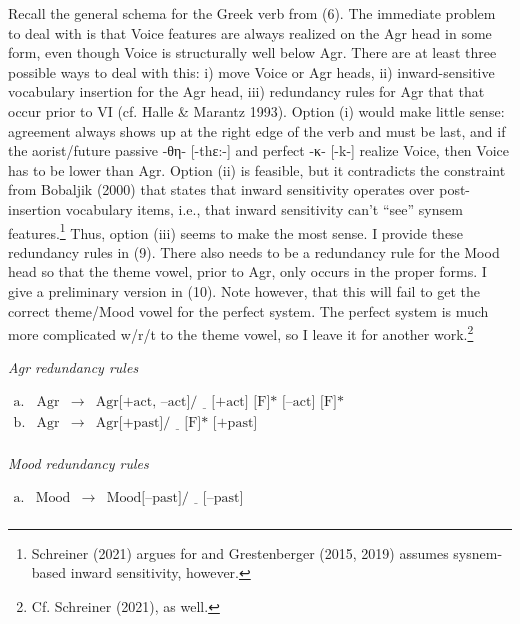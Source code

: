 \documentclass[]{ling-200b-2}
\begin{document}
Recall the general schema for the Greek verb from (6). The immediate problem to deal with is that Voice features are always realized on the Agr head in some form, even though Voice is structurally well below Agr. There are at least three possible ways to deal with this: i) move Voice or Agr heads, ii) inward-sensitive vocabulary insertion for the Agr head, iii) redundancy rules for Agr that that occur prior to VI (cf. Halle \& Marantz 1993). Option (i) would make little sense: agreement always shows up at the right edge of the verb and must be last, and if the aorist/future passive -θη- [-t\super hε:-] and perfect -κ- [-k-] realize Voice, then Voice has to be lower than Agr. Option (ii) is feasible, but it contradicts the constraint from Bobaljik (2000) that states that inward sensitivity operates over post-insertion vocabulary items, i.e., that inward sensitivity can't ``see'' synsem features.\footnote{Schreiner (2021) argues for and Grestenberger (2015, 2019) assumes sysnem-based inward sensitivity, however.} Thus, option (iii) seems to make the most sense. I provide these redundancy rules in (9). There also needs to be a redundancy rule for the Mood head so that the theme vowel, prior to Agr, only occurs in the proper forms. I give a preliminary version in (10). Note however, that this will fail to get the correct theme/Mood vowel for the perfect system. The perfect system is much more complicated w/r/t to the theme vowel, so I leave it for another work.\footnote{Cf. Schreiner (2021), as well.}

\noindent \hfill \par
\ex \textit{Agr redundancy rules}

\begin{math}
\begin{array}{llll}
    \textrm{a.} & \textrm{Agr} & \rightarrow & \textrm{Agr[+act, --act]} / \underline{\hspace{1em}} \textrm{[+act] [F]* [--act] [F]*} \\
    \textrm{b.} & \textrm{Agr} & \rightarrow & \textrm{Agr[+past]} / \underline{\hspace{1em}} \textrm{[F]* [+past]} \\
\end{array}
\end{math}
\xe


\noindent \hfill \par
\ex \textit{Mood redundancy rules}

\begin{math}
\begin{array}{llll}
    \textrm{a.} & \textrm{Mood} & \rightarrow & \textrm{Mood[--past]} / \underline{\hspace{1em}} \textrm{[--past]} \\
\end{array}
\end{math}
\xe
\end{document}

